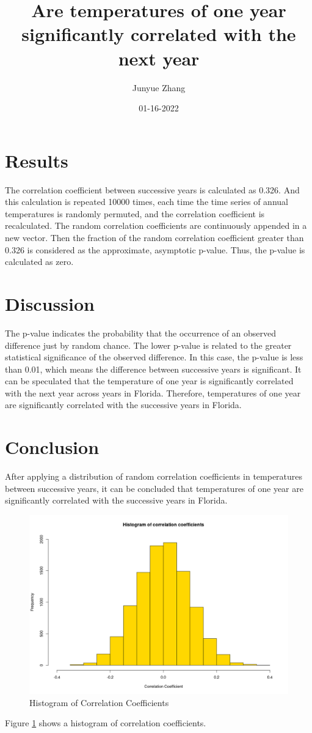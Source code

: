 \documentclass[10pt, a4paper]{article}
\title{Are temperatures of one year significantly correlated with the next year}
\author{Junyue Zhang}
\date{01-16-2022}
\begin{document}
  \maketitle
  
  \section{Results}
    The correlation coefficient between successive years is calculated as 0.326. And this calculation is repeated 10000 times, each time the time series of annual temperatures is randomly permuted, and the correlation coefficient is recalculated. The random correlation coefficients are continuously appended in a new vector. Then the fraction of the random correlation coefficient greater than 0.326 is considered as the approximate, asymptotic p-value. 
    Thus, the p-value is calculated as zero.  
   
  \section{Discussion}
    The p-value indicates the probability that the occurrence of an observed difference just by random chance. The lower p-value is related to the greater statistical significance of the observed difference.
    In this case, the p-value is less than 0.01, which means the difference between successive years is significant.
    It can be speculated that the temperature of one year is significantly correlated with the next year across years in Florida.  
    Therefore, temperatures of one year are significantly correlated with the successive years in Florida.

  \section{Conclusion}
    After applying a distribution of random correlation coefficients in temperatures between successive years, it can be concluded that temperatures of one year are significantly correlated with the successive years in Florida.

\begin{figure}[h]
  \centering
  \includegraphics[scale = 0.3]{./Hist.png}
  \caption{Histogram of Correlation Coefficients}
  \label{figure1}
\end{figure}
Figure \ref{figure1} shows a histogram of correlation coefficients.
\end{document}

